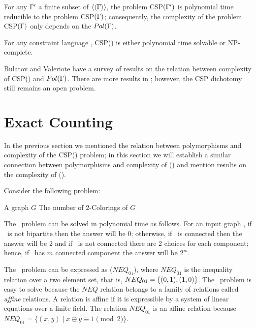 \begin{cor}
For any \(\Gamma'\) a finite subset of \(\langle\langle \Gamma \rangle\rangle\),
the problem CSP\((\Gamma')\) is polynomial time reducible to the problem CSP\((\Gamma)\);
consequently, the complexity of the problem CSP\((\Gamma)\) only depends on the \(Pol(\Gamma)\)\@.
\end{cor}

\begin{conj} 
For any constraint language \mrelset, CSP(\mrelset) is either polynomial time solvable or NP-complete.
\end{conj}

Bulatov and Valeriote \cite{recent08} have a survey of results on the relation between complexity of CSP(\mrelset) and \(Pol(\Gamma)\). There are more results in \cite{dur628, valeriote}; however,
the CSP dichotomy still remains an open problem. 

\section{Exact Counting}
In the previous section we mentioned the relation between polymorphisms and complexity of
the CSP(\mrelset) problem; in this section we will establish a similar connection 
between polymorphisms and complexity of \ccsp(\mrelset) and mention 
results on the complexity of \ccsp(\mrelset)\@.

Consider the following problem:

\pdef{\cdcol}
{A graph \(G\)}
{The number of 2-Colorings of \(G\)}

The \cdcol\ problem can be solved in polynomial time as follows.
For an input graph \mG, if \mG\ is not bipartite then the answer will be \(0\); otherwise,
if \mG\ is connected then the answer will be 2 and if \mG\ is not connected
there are 2 choices for each component; hence, if \mG\ has \(m\)
connected component the answer will be \(2^m\)\@.

The \cdcol\ problem can be expressed as \ccsp(\(NEQ_{01}\)), where
\(NEQ_{01}\) is the inequality relation over a two element set, that is,
\(NEQ_{01}=\{{(0,1),(1,0)}\}\)\@. 
The \cdcol\ problem is easy to solve because
the \(NEQ\) relation belongs to a family of relations called \emph{affine} relations.
A relation is affine if it is expressible by a system of linear equations over a
finite field. The relation \(NEQ_{01}\) is an 
affine relation because \(NEQ_{01} = \{(x,y)\mid x\oplus y \equiv 1 \pmod{2}\}\)\@.

